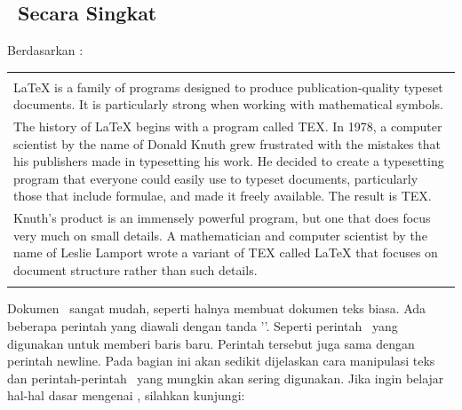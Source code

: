 \chapter{\topikDua}

\section{\latex~Secara Singkat}
Berdasarkan \cite{latex.intro}: \\ 
\begin{tabular}{| p{13cm} |}
	\hline 
	\\
	LaTeX is a family of programs designed to produce publication-quality 
	typeset documents. It is particularly strong when working with 
	mathematical symbols. \\	
	The history of LaTeX begins with a program called TEX. In 1978, a 
	computer scientist by the name of Donald Knuth grew frustrated with the 
	mistakes that his publishers made in typesetting his work. He decided 
	to create a typesetting program that everyone could easily use to 
	typeset documents, particularly those that include formulae, and made 
	it freely available. The result is TEX. \\	
	Knuth's product is an immensely powerful program, but one that does 
	focus very much on small details. A mathematician and computer 
	scientist by the name of Leslie Lamport wrote a variant of TEX called 
	LaTeX that focuses on document structure rather than such details. \\
	\\
	\hline
\end{tabular}

\vspace*{0.8cm}

Dokumen \latex~sangat mudah, seperti halnya membuat dokumen teks biasa. Ada 
beberapa perintah yang diawali dengan tanda '\bslash'. 
Seperti perintah \bslash\bslash~yang digunakan untuk memberi baris baru. 
Perintah tersebut juga sama dengan perintah \bslash newline. 
Pada bagian ini akan sedikit dijelaskan cara manipulasi teks dan 
perintah-perintah \latex~yang mungkin akan sering digunakan. 
Jika ingin belajar hal-hal dasar mengenai \latex, silahkan kunjungi: 

